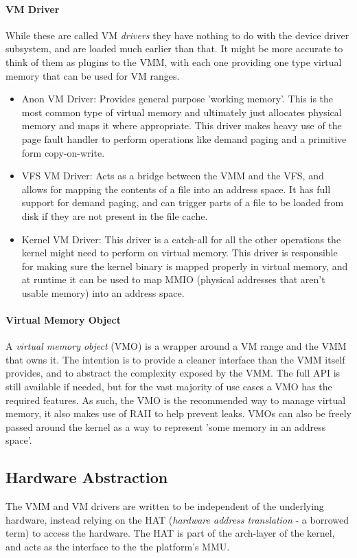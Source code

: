 \paragraph{VM Driver} 
\label{vmdrivers}
While these are called VM \textit{drivers} they have nothing to do with the device driver subsystem, and are loaded much earlier than that. It might be more accurate to think of them as plugins to the VMM, with each one providing one type virtual memory that can be used for VM ranges.

\begin{itemize}
    \item Anon VM Driver: Provides general purpose 'working memory'. This is the most common type of virtual memory and ultimately just allocates physical memory and maps it where appropriate. This driver makes heavy use of the page fault handler to perform operations like demand paging and a primitive form copy-on-write.
    \item VFS VM Driver: Acts as a bridge between the VMM and the VFS, and allows for mapping the contents of a file into an address space. It has full support for demand paging, and can trigger parts of a file to be loaded from disk if they are not present in the file cache.
    \item Kernel VM Driver: This driver is a catch-all for all the other operations the kernel might need to perform on virtual memory. This driver is responsible for making sure the kernel binary is mapped properly in virtual memory, and at runtime it can be used to map MMIO (physical addresses that aren't usable memory) into an address space.
\end{itemize}

\paragraph{Virtual Memory Object}
A \textit{virtual memory object} (VMO) is a wrapper around a VM range and the VMM that owns it. The intention is to provide a cleaner interface than the VMM itself provides, and to abstract the complexity exposed by the VMM. The full API is still available if needed, but for the vast majority of use cases a VMO has the required features. As such, the VMO is the recommended way to manage virtual memory, it also makes use of RAII to help prevent leaks. VMOs can also be freely passed around the kernel as a way to represent 'some memory in an address space'.

\subsection{Hardware Abstraction}
The VMM and VM drivers are written to be independent of the underlying hardware, instead relying on the HAT (\textit{hardware address translation} - a borrowed term) to access the hardware. The HAT is part of the arch-layer of the kernel, and acts as the interface to the the platform's MMU.

